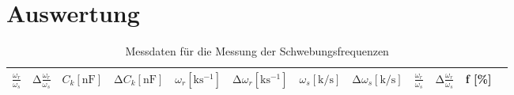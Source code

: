 \section{Auswertung}
\label{sec:Auswertung}


\begin{table}
  \centering
  \caption{Messdaten für die Messung der Schwebungsfrequenzen}
  \label{tab:1}
  \begin{tabular}{c c c c c c c c c c c c}
    \toprule
    {$\frac{\omega_r}{\omega_s}$} & {$\increment \frac{\omega_r}{\omega_s} $} & {$ C_k [\si{\nano\farad}] $} & {$\increment C_k [\si{\nano\farad}] $} & {$ \omega_r [\si{\kilo\second\tothe{-1}}] $} & {$\increment \omega_r [\si{\kilo\second\tothe{-1}}] $} & {$ \omega_s [\si{\kilo\per\second}] $} & {$\increment \omega_s [\si{\kilo\per\second}] $} & {$\frac{\omega_r}{\omega_s}_{\text{}}$} & {$\increment \frac{\omega_r}{\omega_s}_{\text{}}$} & {f [\%]} \\
    \midrule
    
    \bottomrule
  \end{tabular}
\end{table}

%
%
%
%
%
%    
%
%
